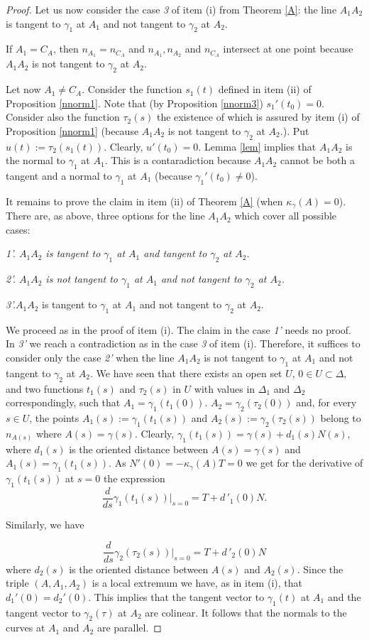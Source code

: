 \documentclass[a4paper,12pt]{amsart}
\def\g{\gamma}
\begin{document}
\begin{proof}
Let us now consider the case \emph{3} of item (i) from Theorem \ref{A}: the line $A_1A_2$ is tangent to $\g_1$ at $A_1$ and not tangent to
$\g_2$ at $A_2$.

If $A_1=C_A$, then
$n_{A_1}=n_{C_A}$ and  $n_{A_1}, n_{A_2}$ and $n_{C_A}$ intersect at one point because $A_1A_2$ is not tangent to $\g_2$ at $A_2$.

Let now $A_1\neq C_A$. Consider the function
$s_1(t)$ defined in item (ii) of Proposition \ref{nnorm1}. Note that (by Proposition
\ref{nnorm3}) $s_1'(t_0)=0$. Consider also the function $\tau_2(s)$ the existence of which is assured by item (i) of Proposition \ref{nnorm1}
(because $A_1A_2$ is not tangent to $\g_2$ at $A_2$.). Put $u(t):=\tau_2(s_1(t))$. Clearly, $u'(t_0)=0$. Lemma \ref{lem} implies that $A_1A_2$ is the normal to $\g_1$ at $A_1$. This is a contaradiction because $A_1A_2$ cannot be both a tangent and a normal to $\g_1$ at $A_1$ (because $\g_1'(t_0) \neq 0 $).

\medskip
It remains to prove the claim in item (ii) of  Theorem \ref{A} (when
$\kappa_{\g}(A)=0$).  There are, as above, three options for the line $A_1A_2$ which cover all possible cases:

\emph{1'. $A_1A_2$ is tangent to $\g_1$ at $A_1$ and  tangent to $\g_2$ at $A_2$.}

\emph{2'. $A_1A_2$ is not tangent to $\g_1$ at $A_1$ and not tangent to $\g_2$
at $A_2$. }

\emph{3'.}$ A_1A_2$ is tangent to $\g_1$ at $A_1$ and not tangent to $\g_2$
at $A_2$.

We proceed as in the proof of item (i).  The claim in the case \emph{1' } needs no proof. In \emph{3'} we reach a contradiction as in the case  \emph{3} of item (i). Therefore, it suffices to consider only the case \emph{2'} when the line
$A_1A_2$ is not tangent to $\g_1$ at $A_1$
and not tangent to $\g_2$ at $A_2$. We have seen that there exists an open set
$U$, $0 \in U \subset \Delta$, and two functions
$t_1(s)$ and $\tau_2(s)$ in $U$ with values in
$\Delta_1$ and $\Delta_2$ correspondingly,  such that $A_1=\g_1(t_1(0))$.
$A_2 = \g_2(\tau_2(0))$
and, for every $s \in U$, the points
$A_1(s):=\g_1(t_1(s)) $ and $A_2(s):=\g_2(\tau_2(s))$ belong to $n_{A(s)}$
where $A(s) = \g(s)$. Clearly,
$\g_1(t_1(s)) = \g(s) +d_1(s) N(s)$, where $d_1(s)$ is the oriented distance between
$A(s) = \g(s)$ and $A_1(s)=\g_1(t_1(s))$.  As
$N'(0)=-\kappa_{\g}(A)T=0$ we get for the derivative of $\g_1(t_1(s)) $ at $s=0$ the expression
$$\frac{d}{ds}\g_1(t_1(s))|_{s=0}=
T+d\,'_1(0)N.$$


Similarly, we have

$$\frac{d}{ds}\g_2(\tau_2(s))|_{s=0}=
T+d\,'_2(0)N$$
where $d_2(s)$ is the oriented distance between $A(s)$ and $A_2(s)$.
Since the triple $(A, A_1,A_2)$ is a local extremum
we have, as in item (i), that $d_1'(0)=d_2'(0)$. This implies that the tangent vector to
$\g_1(t)$ at $A_1$ and the tangent vector to $\g_2(\tau)$ at $A_2$ are colinear. It follows that the normals to the curves at $A_1$ and $A_2$ are parallel.
\end{proof}
\end{document}
